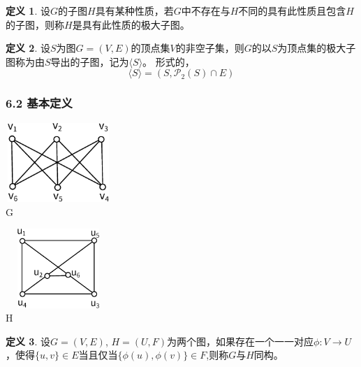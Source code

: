 \documentclass{beamer}
\theoremstyle{definition}
\newtheorem{Def}{定义}[section]
\theoremstyle{example}
\begin{document}
\begin{CJK*}{UTF8}{gbsn}
\begin{frame}
    \pause
  \begin{Def}
    设$G$的子图$H$具有某种性质，若$G$中不存在与$H$不同的具有此性质且包含$H$的子图，则称$H$是具有此性质的\alert{极大子图}。
  \end{Def}
\pause
  \begin{Def}
    设$S$为图$G=(V,E)$的顶点集$V$的非空子集，则$G$的以$S$为顶点集的极大子图称为由$S$导出的子图，记为$\langle S \rangle$。
形式的，
\begin{equation*}
  \langle S \rangle=(S, \mathcal{P}_2(S) \cap E)
\end{equation*}
  \end{Def}
\end{frame}
\begin{frame}
  \frametitle{6.2 基本定义}
    \begin{minipage}[c]{0.4\textwidth}
\includegraphics[width=4cm,height=3cm]{k33} \\ \centering G 
    \end{minipage}\hspace{2cm}
    \begin{minipage}[c]{0.4\textwidth}
\includegraphics[width=4cm,height=3cm]{isomorphic} \\ \centering H 
    \end{minipage}
    \pause
  \begin{Def}
    设$G=(V,E)$, $H = (U, F)$为两个图，如果存在一个一一对应$\phi:V \to
    U$，使得$\{u,v\} \in E$当且仅当$\{\phi(u),\phi(v)\} \in F$,则称$G$与$H$\alert{同构}。
  \end{Def}
\end{frame}

\end{CJK*}
\end{document}
